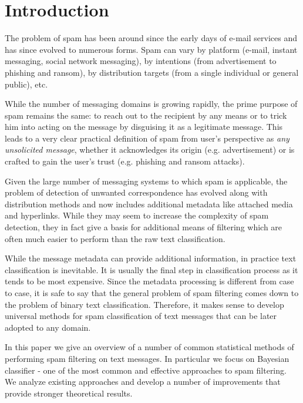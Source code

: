\documentclass[12pt]{report}
\begin{document}
\renewcommand{\bibname}{References}
\setcounter{tocdepth}{1}

\setcounter{page}{2}

\large

\thispagestyle{empty}
\tableofcontents


\chapter*{Introduction}

The problem of spam has been around since the early days of e-mail services and has since evolved to numerous forms. Spam can vary by platform (e-mail, instant messaging, social network messaging), by intentions (from advertisement to phishing and ransom), by distribution targets (from a single individual or general public), etc.

While the number of messaging domains is growing rapidly, the prime purpose of spam remains the same: to reach out to the recipient by any means or to trick him into acting on the message by disguising it as a legitimate message. This leads to a very clear practical definition of spam from user's perspective as \textit{any unsolicited message}, whether it acknowledges its origin (e.g. advertisement) or is crafted to gain the user's trust (e.g. phishing and ransom attacks).

Given the large number of messaging systems to which spam is applicable, the problem of detection of unwanted correspondence has evolved along with distribution methods and now includes additional metadata like attached media and hyperlinks. While they may seem to increase the complexity of spam detection, they in fact give a basis for additional means of filtering which are often much easier to perform than the raw text classification.

While the message metadata can provide additional information, in practice text classification is inevitable. It is usually the final step in classification process as it tends to be most expensive. Since the metadata processing is different from case to case, it is safe to say that the general problem of spam filtering comes down to the problem of binary text classification. Therefore, it makes sense to develop universal methods for spam classification of text messages that can be later adopted to any domain.

In this paper we give an overview of a number of common statistical methods of performing spam filtering on text messages. In particular we focus on Bayesian classifier - one of the most common and effective approaches to spam filtering. We analyze existing approaches and develop a number of improvements that provide stronger theoretical results.
\end{document}
